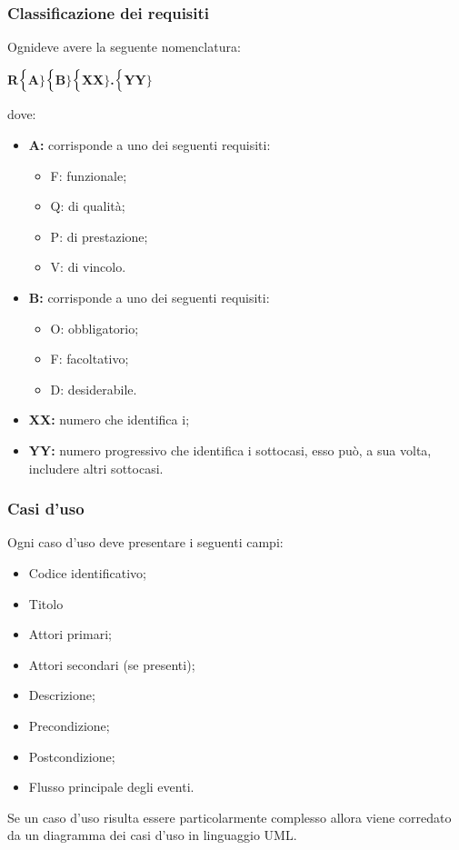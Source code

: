 \subsubsection{Classificazione dei requisiti}
Ognideve avere la seguente nomenclatura:
\begin{center}
	\textbf{R$\Bigl\{$A$\Bigr\}$$\Bigl\{$B$\Bigr\}$$\Bigl\{$XX$\Bigr\}$.$\Bigl\{$YY$\Bigr\}$}
\end{center}
dove:
\begin{itemize}
	\item \textbf{A:} corrisponde a uno dei seguenti requisiti:
	\begin{itemize}
		\item F: funzionale;
		\item Q: di qualità;
		\item P: di prestazione;
		\item V: di vincolo.
	\end{itemize}
	\item \textbf{B:} corrisponde a uno dei seguenti requisiti:
	\begin{itemize}
		\item O: obbligatorio;
		\item F: facoltativo;
		\item D: desiderabile.
	\end{itemize}
	\item \textbf{{XX}:} numero che identifica i;
	\item \textbf{{YY}:} numero progressivo che identifica i sottocasi, esso può, a sua volta, includere altri sottocasi.
\end{itemize}

\subsubsection{Casi d'uso}
Ogni caso d'uso deve presentare i seguenti campi:
\begin{itemize}
	\item Codice identificativo;
	\item Titolo
	\item Attori primari;
	\item Attori secondari (se presenti);
	\item Descrizione;
	\item Precondizione;
	\item Postcondizione;
	\item Flusso principale degli eventi.
\end{itemize}
Se un caso d'uso risulta essere particolarmente complesso allora viene corredato da un diagramma dei casi d'uso in linguaggio UML.
